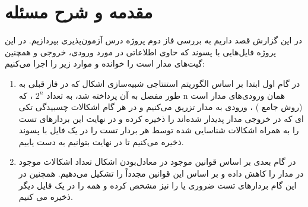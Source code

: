 \section{مقدمه و شرح مسئله}

در این گزارش قصد داریم به بررسی فاز دوم پروژه درس آزمون‌پذیری بپردازیم. در این پروژه فایل‌هایی با پسوند 
که حاوی اطلاعاتی در مورد ورودی، خروجی و همچنین گیت‌های مدار است را خوانده و موارد زیر را اجرا می‌کنیم:

\begin{enumerate}
	\item 
	در گام اول ابتدا بر اساس الگوریتم استنتاجی شبیه‌سازی اشکال 
	که در فاز قبلی به طور مفصل به آن پرداخته شد،
	به تعداد 
	$2^n$
	، که n همان ورودی‌های مدار است (روش جامع
	) ، ورودی به مدار تزریق می‌کنیم و در هر گام اشکالات چسبیدگی تکی
	ای که در خروجی مدار پدیدار شده‌اند را ذخیره کرده و در نهایت این بردارهای تست را به همراه اشکالات شناسایی شده توسط هر بردار تست را در یک فایل با پسوند 
	ذخیره می‌کنیم تا در نهایت بتوانیم به 
	دست یابیم.

	\item 
	در گام بعدی بر اساس قوانین موجود در معادل‌بودن اشکال 
	تعداد اشکالات موجود در مدار را کاهش داده و بر اساس این قوانین مجدداً 
	را تشکیل می‌دهیم. همچنین در این گام بردار‌های تست ضروری یا 
	را نیز مشخص کرده و همه را در یک فایل
	دیگر ذخیره می کنیم.
\end{enumerate}
